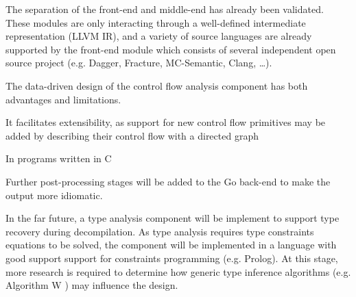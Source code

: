 The separation of the front-end and middle-end has already been validated. These modules are only interacting through a well-defined intermediate representation (LLVM IR), and a variety of source languages are already supported by the front-end module which consists of several independent open source project (e.g. Dagger, Fracture, MC-Semantic, Clang, …).


























The data-driven design of the control flow analysis component has both advantages and limitations.

It facilitates extensibility, as support for new control flow primitives may be added by describing their control flow with a directed graph






In programs written in C

Further post-processing stages will be added to the Go back-end to make the output more idiomatic.


In the far future, a type analysis component will be implement to support type recovery during decompilation. As type analysis requires type constraints equations to be solved, the component will be implemented in a language with good support support for constraints programming (e.g. Prolog). At this stage, more research is required to determine how generic type inference algorithms (e.g. Algorithm W \cite{algorithm_w}) may influence the design.
